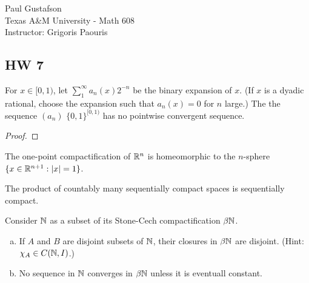 \documentclass{article}
\begin{document}
\noindent Paul Gustafson\\
\noindent Texas A\&M University - Math 608 \\ 
\noindent Instructor: Grigoris Paouris

\subsection*{HW 7}

 For $x \in [0,1)$, let $\sum_1^\infty a_n(x) 2^{-n}$ be the binary expansion of $x$. (If $x$ is a dyadic rational, choose the expansion such that $a_n(x) = 0$ for $n$ large.) The the sequence $(a_n)$ \in $\{0, 1\}^{[0,1)}$ has no pointwise convergent sequence.

\begin{proof}

\end{proof}


 The one-point compactification of $\mathbb{R}^n$ is homeomorphic to the $n$-sphere 
$\{ x \in \mathbb{R}^{n+1} : |x| = 1\}$.

 The product of countably many sequentially compact spaces is sequentially compact.


 Consider $\mathbb{N}$ as a subset of its Stone-Cech compactification $\beta\mathbb{N}$.
\begin{enumerate}[a.]
\item If $A$ and $B$ are disjoint subsets of $\mathbb{N}$, their closures in $\beta\mathbb{N}$ are disjoint. (Hint: $\chi_A \in C(\mathbb{N}, I)$.)
\item No sequence in $\mathbb{N}$ converges in $\beta\mathbb{N}$ unless it is eventuall constant.
\end{enumerate}
\end{document}
